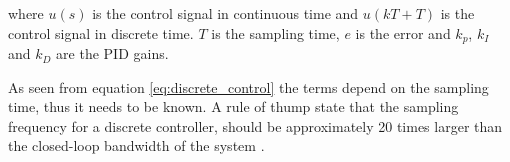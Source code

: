 \documentclass[../../main.tex]{subfiles}
\begin{document}
where $u(s)$ is the control signal in continuous time and $u(kT+T)$ is the control signal in discrete time. $T$ is the sampling time, $e$ is the error and $k_p$, $k_I$ and $k_D$ are the PID gains.

As seen from equation \ref{eq:discrete_control} the terms depend on the sampling time, thus it needs to be known. A rule of thump state that the sampling frequency for a discrete controller, should be approximately 20 times larger than the closed-loop bandwidth of the system \cite{Design_Of_Digital_Control_Systems_NOTE}. 

\end{document}
